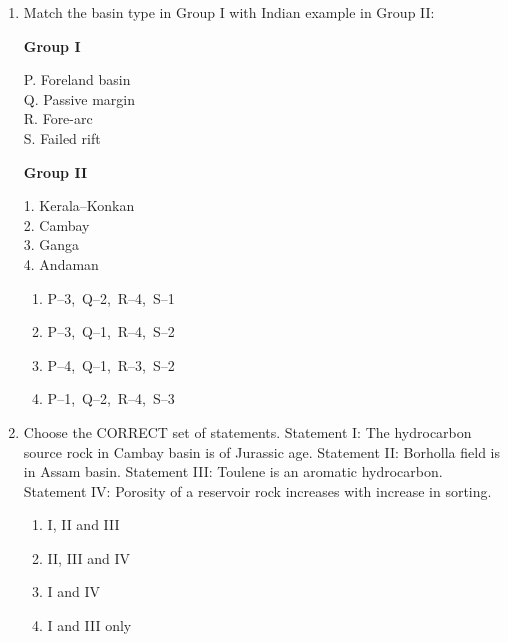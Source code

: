 \documentclass[journal,12pt,onecolumn]{IEEEtran}
\theoremstyle{remark}
\begin{document}
\begin{enumerate}
\begin{multicols}{2}
\begin{enumerate}
\item P--1,\ Q--3,\ R--4,\ S--2
\item P--3,\ Q--4,\ R--2,\ S--1
\item P--2,\ Q--1,\ R--4,\ S--3
\item P--3,\ Q--4,\ R--1,\ S--2
\end{enumerate}
\end{multicols}



\item Match the basin type in Group I with Indian example in Group II:

\begin{multicols}{2}
\textbf{Group I}
\begin{flushleft}
P. Foreland basin\\
Q. Passive margin\\
R. Fore-arc\\
S. Failed rift
\end{flushleft}

\columnbreak

\textbf{Group II}
\begin{flushleft}
1. Kerala--Konkan\\
2. Cambay\\
3. Ganga\\
4. Andaman
\end{flushleft}
\end{multicols}

\begin{multicols}{2}
\begin{enumerate}
\item P--3,\ Q--2,\ R--4,\ S--1
\item P--3,\ Q--1,\ R--4,\ S--2
\item P--4,\ Q--1,\ R--3,\ S--2
\item P--1,\ Q--2,\ R--4,\ S--3
\end{enumerate}
\end{multicols}




\item Choose the CORRECT set of statements.  
Statement I: The hydrocarbon source rock in Cambay basin is of Jurassic age.  
Statement II: Borholla field is in Assam basin.  
Statement III: Toulene is an aromatic hydrocarbon.  
Statement IV: Porosity of a reservoir rock increases with increase in sorting.  
\begin{multicols}{2}
\begin{enumerate}
\item I, II and III
\item II, III and IV
\item I and IV
\item I and III only
\end{enumerate}
\end{multicols}


\end{enumerate}
\end{document}
